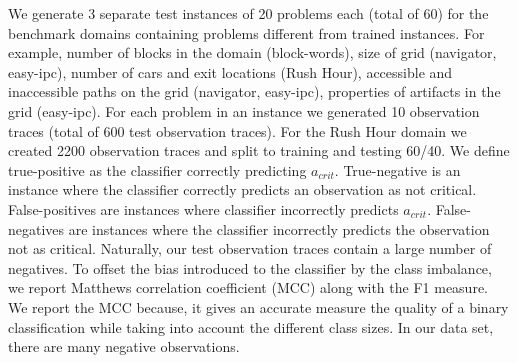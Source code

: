 \documentclass[letterpaper]{article}
\theoremstyle{plain}
\begin{document}
We generate 3 separate test instances of 20 problems each (total of 60) for the benchmark domains containing problems different from trained instances. For example, number of blocks in the domain (block-words), size of grid (navigator, easy-ipc), number of cars and exit locations (Rush Hour), accessible and inaccessible paths on the grid (navigator, easy-ipc), properties of artifacts in the grid (easy-ipc). For each problem in an instance we generated 10 observation traces (total of 600 test observation traces). For the Rush Hour domain we created 2200 observation traces and split to training and testing 60/40. We define true-positive as the classifier correctly predicting $a_{crit}$. True-negative is an instance where the classifier  correctly predicts an observation as not critical. False-positives are instances where classifier incorrectly predicts $a_{crit}$. False-negatives are instances where the classifier incorrectly predicts the observation not as critical. Naturally, our test observation traces contain a large number of negatives. To offset the bias introduced to the classifier by the class imbalance, we report Matthews correlation coefficient (MCC) along with the F1 measure. We report the MCC because, it gives an accurate measure the quality of a binary classification while taking into account the different class sizes. In our data set, there are many negative observations.
\end{document}
